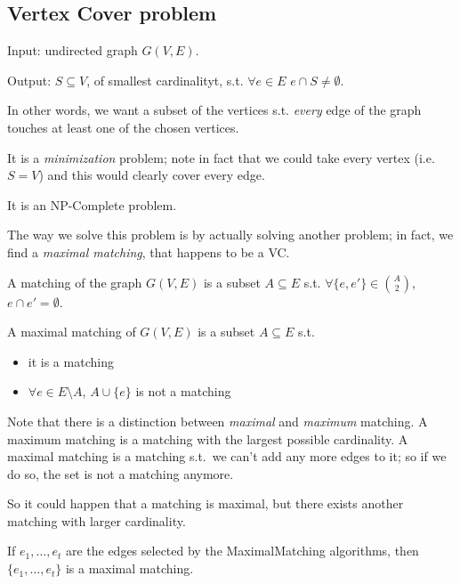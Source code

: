 \subsection{Vertex Cover problem}\label{subsec:vertcover}

    Input: undirected graph $G(V,E)$.

    Output: $S \subseteq V$, of smallest cardinalityt, s.t. $\forall e \in E$ $e \cap S \neq \emptyset$.

    In other words, we want a subset of the vertices s.t. \textit{every} edge of the graph touches at least one of the chosen vertices.

    It is a \textit{minimization} problem; note in fact that we could take every vertex (i.e. $S = V$) and this would clearly cover every edge.

    It is an NP-Complete problem.

    

    The way we solve this problem is by actually solving another problem; in fact, we find a \textit{maximal matching}, that happens to be a VC.

    \begin{definition}[Matching]
        A matching of the graph $G(V,E)$ is a subset $A \subseteq E$ s.t. $\forall \{ e,e' \} \in \binom{A}{2}$, $e \cap e' = \emptyset$.
    \end{definition}

    \begin{definition}
        A maximal matching of $G(V,E)$ is a subset $A \subseteq E$ s.t.
        \begin{itemize}
            \item it is a matching
            \item $\forall e \in E \setminus A$, $A \cup \{e\}$ is not a matching
        \end{itemize}
    \end{definition}

    Note that there is a distinction between \textit{maximal} and \textit{maximum} matching.
    A maximum matching is a matching with the largest possible cardinality.
    A maximal matching is a matching s.t.~we can't add any more edges to it; so if we do so, the set is not a matching anymore.

    So it could happen that a matching is maximal, but there exists another matching with larger cardinality.

    \begin{lemma}\label{lemma:vc1}
        If $e_1, \dots, e_t$ are the edges selected by the MaximalMatching algorithms, then $\{ e_1, \dots, e_t \}$ is a maximal matching.
    \end{lemma}

